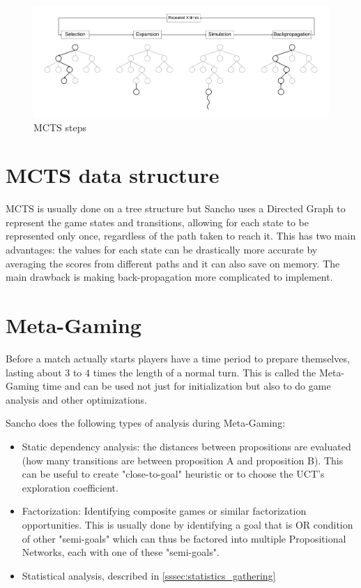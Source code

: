 \begin{figure}[h]
	\centering
	\includegraphics[width=\textwidth]{images/MCTS.pdf}
	\caption{MCTS steps}
	\label{fig:mcts steps}
\end{figure}

\section{MCTS data structure}
MCTS is usually done on a tree structure but Sancho uses a Directed Graph to represent the game states and transitions, allowing for each state to be represented only once, regardless of the path taken to reach it.
This has two main advantages: the values for each state can be drastically more accurate by averaging the scores from different paths and it can also save on memory.
The main drawback is making back-propagation more complicated to implement.


\section{Meta-Gaming}
Before a match actually starts players have a time period to prepare themselves, lasting about 3 to 4 times the length of a normal turn. This is called the Meta-Gaming time and can be used not just for initialization but also to do game analysis and other optimizations.

Sancho does the following types of analysis during Meta-Gaming: 
\begin{itemize}
	\item Static dependency analysis: the distances between propositions are evaluated (how many transitions are between proposition A and proposition B). This can be useful to create "close-to-goal" heuristic or to choose the UCT's exploration coefficient. 
	
	\item Factorization: Identifying composite games or similar factorization opportunities. This is usually done by identifying a goal that is OR condition of other "semi-goals" which can thus be factored into multiple Propositional Networks, each with one of these "semi-goals".	 
	
	\item Statistical analysis, described in \ref{sssec:statistics_gathering}
\end{itemize}

